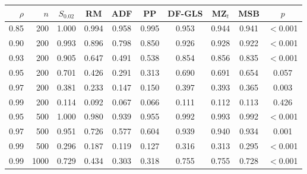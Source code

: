 \begin{tabular}{rrcccccccc}
\toprule
$\rho$ & $n$ & $S_{0.02}$ & RM & ADF & PP & DF-GLS & MZ$_t$ & MSB & $p$ \\
\midrule
0.85 & 200 & 1.000 & 0.994 & 0.958 & 0.995 & 0.953 & 0.944 & 0.941 & $<$0.001 \\
0.90 & 200 & 0.993 & 0.896 & 0.798 & 0.850 & 0.926 & 0.928 & 0.922 & $<$0.001 \\
0.93 & 200 & 0.905 & 0.647 & 0.491 & 0.538 & 0.854 & 0.856 & 0.835 & $<$0.001 \\
0.95 & 200 & 0.701 & 0.426 & 0.291 & 0.313 & 0.690 & 0.691 & 0.654 & 0.057 \\
0.97 & 200 & 0.381 & 0.233 & 0.147 & 0.150 & 0.397 & 0.393 & 0.365 & 0.003 \\
0.99 & 200 & 0.114 & 0.092 & 0.067 & 0.066 & 0.111 & 0.112 & 0.113 & 0.426 \\
0.95 & 500 & 1.000 & 0.980 & 0.939 & 0.955 & 0.992 & 0.993 & 0.992 & $<$0.001 \\
0.97 & 500 & 0.951 & 0.726 & 0.577 & 0.604 & 0.939 & 0.940 & 0.934 & 0.001 \\
0.99 & 500 & 0.296 & 0.187 & 0.119 & 0.127 & 0.316 & 0.313 & 0.295 & $<$0.001 \\
0.99 & 1000 & 0.729 & 0.434 & 0.303 & 0.318 & 0.755 & 0.755 & 0.728 & $<$0.001 \\
\bottomrule
\end{tabular}
